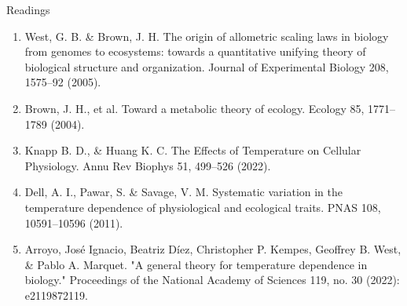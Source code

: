   
  \begin{frame}{Readings}
    \begin{enumerate}\setlength{\itemindent}{-2em}\itemsep4pt
  \small
    
    \item West, G. B. \& Brown, J. H. The origin of allometric scaling laws in
    biology from genomes to ecosystems: towards a quantitative unifying theory of biological structure and organization. Journal of Experimental Biology 208, 1575–92 (2005).
    
      
    \item Brown, J. H., et al. Toward a metabolic theory of ecology. Ecology 85,
    1771--1789 (2004). 
    
    \item Knapp B. D., \& Huang K. C. The Effects of Temperature on Cellular
    Physiology. Annu Rev Biophys 51, 499--526 (2022).

    \item Dell, A. I., Pawar, S. \& Savage, V. M. Systematic variation in the
    temperature dependence of physiological and ecological traits. PNAS 108,
    10591--10596 (2011).
  
    \item Arroyo, José Ignacio, Beatriz Díez, Christopher P. Kempes, Geoffrey B. West, \& Pablo A. Marquet. "A general theory for temperature dependence in biology." Proceedings of the National Academy of Sciences 119, no. 30 (2022): e2119872119.
  
    \end{enumerate}
  
\end{frame}

